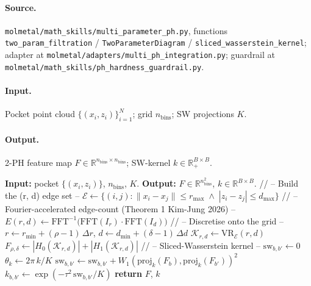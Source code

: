 \paragraph{Source.}
\texttt{molmetal/math\_skills/multi\_parameter\_ph.py}, functions
\texttt{two\_param\_filtration} / \texttt{TwoParameterDiagram} /
\texttt{sliced\_wasserstein\_kernel}; adapter at
\texttt{molmetal/adapters/multi\_ph\_integration.py}; guardrail
at \texttt{molmetal/math\_skills/ph\_hardness\_guardrail.py}.

\paragraph{Input.}
Pocket point cloud $\{(x_{i}, z_{i})\}_{i=1}^{N}$; grid
$n_{\mathrm{bins}}$; SW projections $K$.

\paragraph{Output.}
2-PH feature map $F \in \mathbb{R}^{n_{\mathrm{bins}} \times
n_{\mathrm{bins}}}$; SW-kernel $k \in \mathbb{R}^{B \times B}_{+}$.

\begin{algorithmic}[1]
  \STATE \textbf{Input:} pocket $\{(x_{i}, z_{i})\}$, $n_{\mathrm{bins}}$, $K$.
  \STATE \textbf{Output:} $F \in \mathbb{R}^{n_{\mathrm{bins}}^{2}}$, $k \in \mathbb{R}^{B \times B}$.
  \STATE // -- Build the (r, d) edge set --
  \STATE $\mathcal{E} \gets \{ (i, j) : \| x_{i} - x_{j} \| \le r_{\max}
                              \;\wedge\; |z_{i} - z_{j}| \le d_{\max} \}$
  \STATE // -- Fourier-accelerated edge-count (Theorem 1 Kim-Jung 2026) --
  \STATE $E(r, d) \gets \mathrm{FFT}^{-1}\!\bigl(
                \mathrm{FFT}(I_{r}) \cdot \mathrm{FFT}(I_{d}) \bigr)$
  \STATE // -- Discretise onto the grid --
    \STATE $r \gets r_{\min} + (\rho - 1)\, \Delta r$, $d \gets d_{\min} + (\delta - 1)\, \Delta d$
    \STATE $\mathcal{K}_{r, d} \gets \mathrm{VR}_{\mathcal{E}}(r, d)$
    \STATE $F_{\rho, \delta} \gets |H_{0}(\mathcal{K}_{r, d})| +
                                    |H_{1}(\mathcal{K}_{r, d})|$
  \ENDFOR
  \STATE // -- Sliced-Wasserstein kernel --
    \STATE $\mathrm{sw}_{b, b'} \gets 0$
      \STATE $\theta_{k} \gets 2\pi\, k / K$
      \STATE $\mathrm{sw}_{b, b'} \gets \mathrm{sw}_{b, b'} +
                  W_{1}(\mathrm{proj}_{k}(F_{b}),
                       \mathrm{proj}_{k}(F_{b'}))^{2}$
    \ENDFOR
    \STATE $k_{b, b'} \gets \exp(-\tau^{2}\, \mathrm{sw}_{b, b'} / K)$
  \ENDFOR
  \STATE \textbf{return} $F$, $k$
\end{algorithmic}

